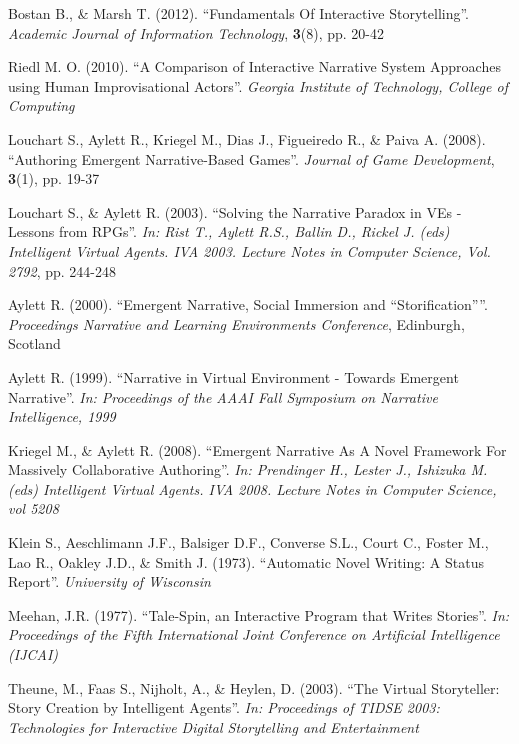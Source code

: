 \documentclass{sig-alternate-05-2015}
\begin{document}
\clearpage
\begin{thebibliography}{20}

Bostan B., \& Marsh T. (2012). 
``Fundamentals Of Interactive Storytelling''. 
\textit{Academic Journal of Information Technology}, \textbf{3}(8), pp. 20-42

Riedl M. O. (2010). 
``A Comparison of Interactive Narrative System Approaches using Human Improvisational Actors''.
\textit{Georgia Institute of Technology, College of Computing}

Louchart S., Aylett R., Kriegel M., Dias J., Figueiredo R., \& Paiva A. (2008).
``Authoring Emergent Narrative-Based Games''.
\textit{Journal of Game Development}, \textbf{3}(1), pp. 19-37

Louchart S., \& Aylett R. (2003).
``Solving the Narrative Paradox in VEs - Lessons from RPGs''.
\textit{In: Rist T., Aylett R.S., Ballin D., Rickel J. (eds) Intelligent Virtual Agents. IVA 2003. Lecture Notes in Computer Science, Vol. 2792}, pp. 244-248

Aylett R. (2000).
``Emergent Narrative, Social Immersion and ``Storification''''.
\textit{Proceedings Narrative and Learning Environments Conference}, Edinburgh, Scotland

Aylett R. (1999).
``Narrative in Virtual Environment - Towards Emergent Narrative''.
\textit{In: Proceedings of the AAAI Fall Symposium on Narrative Intelligence, 1999}

Kriegel M., \& Aylett R. (2008).
``Emergent Narrative As A Novel Framework For Massively Collaborative Authoring''.
\textit{In: Prendinger H., Lester J., Ishizuka M. (eds) Intelligent Virtual Agents. IVA 2008. Lecture Notes in Computer Science, vol 5208}

Klein S., Aeschlimann J.F., Balsiger D.F., Converse S.L., Court C., Foster M., Lao R., Oakley J.D., \& Smith J. (1973).
``Automatic Novel Writing: A Status Report''.
\textit{University of Wisconsin}

Meehan, J.R. (1977).
``Tale-Spin, an Interactive Program that Writes Stories''.
\textit{In: Proceedings of the Fifth International Joint Conference on Artificial Intelligence (IJCAI)}

Theune, M., Faas S., Nijholt, A., \& Heylen, D. (2003).
``The Virtual Storyteller: Story Creation by Intelligent Agents''.
\textit{In: Proceedings of TIDSE 2003: Technologies for Interactive Digital Storytelling and Entertainment}


\end{thebibliography}
\end{document}
